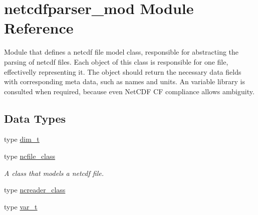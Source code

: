 \hypertarget{namespacenetcdfparser__mod}{}\section{netcdfparser\+\_\+mod Module Reference}
\label{namespacenetcdfparser__mod}


Module that defines a netcdf file model class, responsible for abstracting the parsing of netcdf files. Each object of this class is responsible for one file, effectivelly representing it. The object should return the necessary data fields with corresponding meta data, such as names and units. An variable library is consulted when required, because even Net\+C\+DF CF compliance allows ambiguity.  


\subsection*{Data Types}
\begin{DoxyCompactItemize}
\item 
type \mbox{\hyperlink{structnetcdfparser__mod_1_1dim__t}{dim\+\_\+t}}
\item 
type \mbox{\hyperlink{structnetcdfparser__mod_1_1ncfile__class}{ncfile\+\_\+class}}
\begin{DoxyCompactList}\small\item\em A class that models a netcdf file. \end{DoxyCompactList}\item 
type \mbox{\hyperlink{structnetcdfparser__mod_1_1ncreader__class}{ncreader\+\_\+class}}
\item 
type \mbox{\hyperlink{structnetcdfparser__mod_1_1var__t}{var\+\_\+t}}
\end{DoxyCompactItemize}
